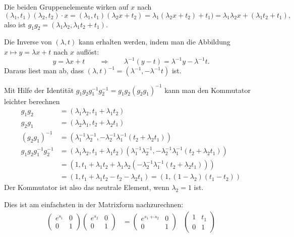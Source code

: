\begin{loesung}
\begin{teilaufgaben}
\item
Die beiden Gruppenelemente wirken auf $x$ nach
\[
(\lambda_1,t_1)
(\lambda_2,t_2)
\cdot
x
=
(\lambda_1,t_1)(\lambda_2x+t_2)
=
\lambda_1(\lambda_2x+t_2)+t_1)
=
\lambda_1\lambda_2 x + (\lambda_1t_2+t_1),
\]
also ist $g_1g_2=(\lambda_1\lambda_2,\lambda_1t_2+t_1)$.
\item
Die Inverse von $(\lambda,t)$ kann erhalten werden, indem man die
Abbildung $x\mapsto y=\lambda x +t$ nach $x$ auflöst:
\[
y=\lambda x+t
\qquad\Rightarrow\qquad
\lambda^{-1}(y-t)
=
\lambda^{-1}y - \lambda^{-1}t.
\]
Daraus liest man ab, dass $(\lambda,t)^{-1}=(\lambda^{-1},-\lambda^{-1}t)$
ist.
\item
Mit Hilfe der Identität $g_1g_2g_1^{-1}g_2^{-1}=g_1g_2(g_2g_1)^{-1}$
kann man den Kommutator leichter berechnen
\begin{align*}
g_1g_2&=(\lambda_1\lambda_2,t_1+\lambda_1t_2)
\\
g_2g_1&= (\lambda_2\lambda_1,t_2+\lambda_2t_1)
\\
(g_2g_1)^{-1}
&=
(\lambda_1^{-1}\lambda_2^{-1},
	-\lambda_2^{-1}\lambda_1^{-1}(t_2+\lambda_2t_1))
\\
g_1g_2g_1^{-1}g_2^{-1}
&=
(\lambda_1\lambda_2,t_1+\lambda_1t_2)
(\lambda_1^{-1}\lambda_2^{-1},
	-\lambda_2^{-1}\lambda_1^{-1}(t_2+\lambda_2t_1))
\\
&=(1,t_1+\lambda_1t_2 + \lambda_1\lambda_2(
	-\lambda_2^{-1}\lambda_1^{-1}(t_2+\lambda_2t_1))
)
\\
&=(1, t_1+\lambda_1t_2 - t_2 -\lambda_2t_1)
=
(1,(1-\lambda_2)(t_1-t_2))
\end{align*}
Der Kommutator ist also das neutrale Element, wenn $\lambda_2=1$ ist.
\item
Dies ist am einfachsten in der Matrixform nachzurechnen:
\begin{align*}
\begin{pmatrix} e^{s_1}&0\\0&1\end{pmatrix}
\begin{pmatrix} e^{s_2}&0\\0&1\end{pmatrix}
&=
\begin{pmatrix}e^{s_1+s_2}&0\\0&1\end{pmatrix}
&
\begin{pmatrix} 1&t_1\\0&1\end{pmatrix}

\end{align*}
\end{teilaufgaben}
\end{loesung}
